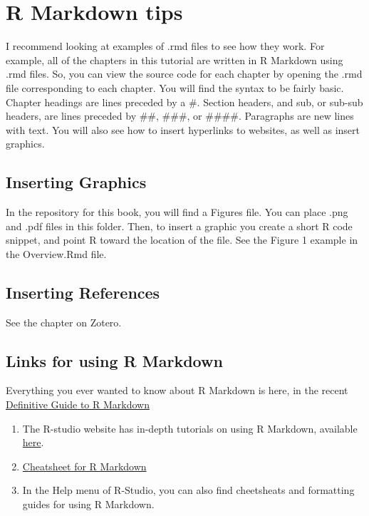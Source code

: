 \documentclass[
]{book}
\providecommand{\tightlist}{%
  \setlength{\itemsep}{0pt}\setlength{\parskip}{0pt}}
\begin{document}
\hypertarget{r-markdown-tips}{%
\section{R Markdown tips}\label{r-markdown-tips}}

I recommend looking at examples of .rmd files to see how they work. For example, all of the chapters in this tutorial are written in R Markdown using .rmd files. So, you can view the source code for each chapter by opening the .rmd file corresponding to each chapter. You will find the syntax to be fairly basic. Chapter headings are lines preceded by a \#. Section headers, and sub, or sub-sub headers, are lines preceded by \#\#, \#\#\#, or \#\#\#\#. Paragraphs are new lines with text. You will also see how to insert hyperlinks to websites, as well as insert graphics.

\hypertarget{inserting-graphics}{%
\subsection{Inserting Graphics}\label{inserting-graphics}}

In the repository for this book, you will find a Figures file. You can place .png and .pdf files in this folder. Then, to insert a graphic you create a short R code snippet, and point R toward the location of the file. See the Figure 1 example in the Overview.Rmd file.

\hypertarget{inserting-references}{%
\subsection{Inserting References}\label{inserting-references}}

See the chapter on Zotero.

\hypertarget{links-for-using-r-markdown}{%
\subsection{Links for using R Markdown}\label{links-for-using-r-markdown}}

Everything you ever wanted to know about R Markdown is here, in the recent \href{https://bookdown.org/yihui/rmarkdown/}{Definitive Guide to R Markdown}

\begin{enumerate}
\def\labelenumi{\arabic{enumi}.}
\tightlist
\item
  The R-studio website has in-depth tutorials on using R Markdown, available \href{http://rmarkdown.rstudio.com/lesson-1.html}{here}.
\item
  \href{http://rmarkdown.rstudio.com/lesson-15.html}{Cheatsheet for R Markdown}
\item
  In the Help menu of R-Studio, you can also find cheetsheats and formatting guides for using R Markdown.
\end{enumerate}
\end{document}
